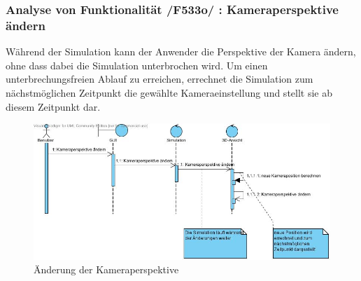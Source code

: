 \subsubsection{Analyse von Funktionalität /F533o/ :  Kameraperspektive ändern}
Während der Simulation kann der Anwender die Perspektive der Kamera ändern, ohne dass dabei die Simulation unterbrochen wird. Um einen unterbrechungsfreien Ablauf zu erreichen, errechnet die Simulation zum nächstmöglichen Zeitpunkt die gewählte Kameraeinstellung und stellt sie ab diesem Zeitpunkt dar. 
\begin{figure}
\includegraphics[width=\linewidth]{bilder/Kameraperspektive.jpg}
\caption{Änderung der Kameraperspektive}
\label{Kameraperspektive}
\end{figure}
